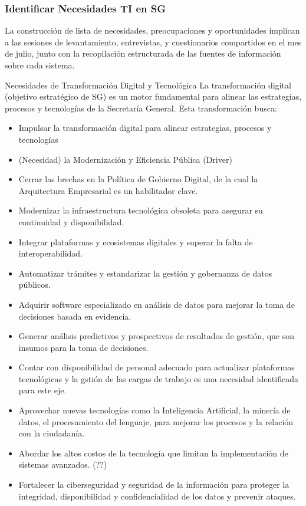 \documentclass[
	a4paper, %
	12pt, %
]{include/CSSullivanBusinessReport}
\begin{document}
\subsubsection{Identificar Necesidades TI en
SG}\label{sec:identificar-necesidades-ti-en-sg}

La construcción de lista de necesidades, preocupaciones y oportunidades
implican a las sesiones de levantamiento, entrevistas, y cuestionarios
compartidos en el mes de julio, junto con la recopilación estructurada
de las fuentes de información sobre cada sistema.

Necesidades de Transformación Digital y Tecnológica La transformación
digital (objetivo estratégico de SG) es un motor fundamental para
alinear las estrategias, procesos y tecnologías de la Secretaría
General. Esta transformación busca:

\begin{itemize}
\item
  Impulsar la transformación digital para alinear estrategias, procesos
  y tecnologías
\item
  (Necesidad) la Modernización y Eficiencia Pública (Driver)
\item
  Cerrar las brechas en la Política de Gobierno Digital, de la cual la
  Arquitectura Empresarial es un habilitador clave.
\item
  Modernizar la infraestructura tecnológica obsoleta para asegurar su
  continuidad y disponibilidad.
\item
  Integrar plataformas y ecosistemas digitales y superar la falta de
  interoperabilidad.
\item
  Automatizar trámites y estandarizar la gestión y gobernanza de datos
  públicos.
\item
  Adquirir software especializado en análisis de datos para mejorar la
  toma de decisiones basada en evidencia.
\item
  Generar análisis predictivos y prospectivos de resultados de gestión,
  que son insumos para la toma de decisiones.
\item
  Contar con disponibilidad de personal adecuado para actualizar
  plataformas tecnológicas y la gstión de las cargas de trabajo es una
  necesidad identificada para este eje.
\item
  Aprovechar nuevas tecnologías como la Inteligencia Artificial, la
  minería de datos, el procesamiento del lenguaje, para mejorar los
  procesos y la relación con la ciudadanía.
\item
  Abordar los altos costos de la tecnología que limitan la
  implementación de sistemas avanzados. (??)
\item
  Fortalecer la ciberseguridad y seguridad de la información para
  proteger la integridad, disponibilidad y confidencialidad de los datos
  y prevenir ataques.
\end{itemize}
\end{document}
